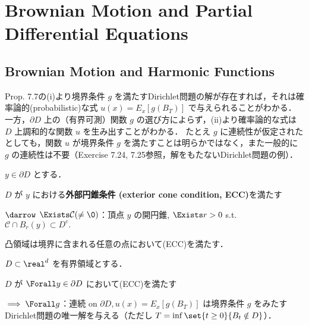 \documentclass{jsarticle}
\title{}
\author{}
\date{
}
\begin{document}
\setcounter{section}{6}
\section{Brownian Motion and Partial Differential Equations}
\setcounter{subsection}{1}
\subsection{Brownian Motion and Harmonic Functions}

Prop. 7.7の(i)より境界条件 $g$ を満たすDirichlet問題の解が存在すれば，それは確率論的(probabilistic)な式 $u(x)=E_x[g(B_T)]$ で与えられることがわかる．
一方，$\partial D$ 上の（有界可測）関数 $g$ の選び方によらず，(ii)より確率論的な式は $D$ 上調和的な関数 $u$ を生み出すことがわかる．
たとえ $g$ に連続性が仮定されたとしても，関数 $u$ が境界条件 $g$ を満たすことは明らかではなく，また一般的に $g$ の連続性は不要（Exercise 7.24, 7.25参照，解をもたないDirichlet問題の例）．

\begin{df*}
    $y\in\partial D$ とする．
    
    $D$ が $y$ における\textbf{外部円錐条件 (exterior cone condition, ECC)}を満たす
    
    $\darrow$
    $\Exists \mathcal{C}(\neq\0)$：頂点 $y$ の開円錐, $\Exists r>0$ s.t. $\mathcal{C}\cap B_r(y)\subset D^c.$
\end{df*}

\begin{ex*}
    凸領域は境界に含まれる任意の点において(ECC)を満たす．
\end{ex*}

\setcounter{thm}{7}
\begin{thm}[Dirichlet問題の解]
    $D\subset \real^d$ を有界領域とする．

    $D$ が $\Forall y\in\partial D$ において(ECC)を満たす

    $\implies \Forall g$：連続 on $\partial D, u(x) = E_x[g(B_T)]$ は境界条件 $g$ をみたすDirichlet問題の唯一解を与える（ただし $T=\inf\set{t\ge0}{B_t\notin D}$）．
\end{thm}
\end{document}
